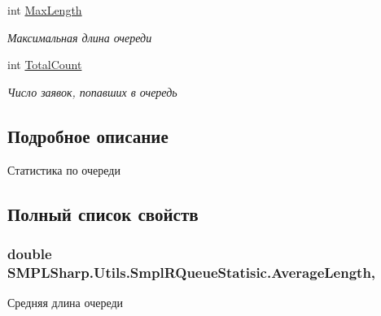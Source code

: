 \begin{DoxyCompactItemize}
int \hyperlink{class_s_m_p_l_sharp_1_1_utils_1_1_smpl_r_queue_statisic_af0c96a5114802513777f2d4cf5e176b9}{Max\-Length}
\begin{DoxyCompactList}\small\item\em Максимальная длина очереди \end{DoxyCompactList}\item 
int \hyperlink{class_s_m_p_l_sharp_1_1_utils_1_1_smpl_r_queue_statisic_aba57ab69353bec5cd8415a53bd6644fe}{Total\-Count}
\begin{DoxyCompactList}\small\item\em Число заявок, попавших в очередь \end{DoxyCompactList}\end{DoxyCompactItemize}


\subsection{Подробное описание}
Статистика по очереди 



\subsection{Полный список свойств}
\hypertarget{class_s_m_p_l_sharp_1_1_utils_1_1_smpl_r_queue_statisic_aab2840b938ed22bd81799f7882cbc6e1}{
\subsubsection[{Average\-Length}]{\setlength{\rightskip}{0pt plus 5cm}double S\-M\-P\-L\-Sharp.\-Utils.\-Smpl\-R\-Queue\-Statisic.\-Average\-Length\hspace{0.3cm}{\ttfamily [get]}, {\ttfamily [set]}}}\label{de/de9/class_s_m_p_l_sharp_1_1_utils_1_1_smpl_r_queue_statisic_aab2840b938ed22bd81799f7882cbc6e1}


Средняя длина очереди 

